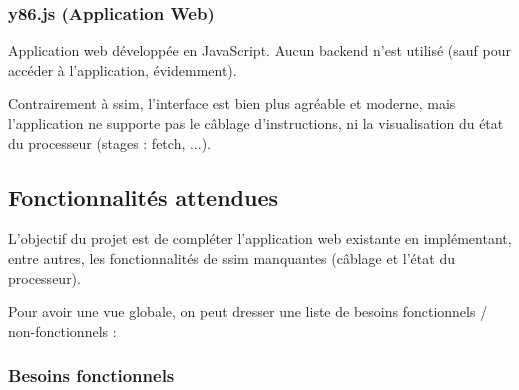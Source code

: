 \documentclass[french]{article}
\begin{document}
\subsubsection{y86.js (Application Web)}

Application web développée en JavaScript. Aucun backend n'est utilisé (sauf pour accéder à l'application, évidemment).

Contrairement à ssim, l'interface est bien plus agréable et moderne, mais l'application ne supporte pas le câblage d'instructions, ni la visualisation du état du processeur (stages : fetch, ...).

\subsection{Fonctionnalités attendues}

L'objectif du projet est de compléter l'application web existante en implémentant, entre autres, les fonctionnalités de ssim manquantes (câblage et l'état du processeur).

Pour avoir une vue globale, on peut dresser une liste de besoins fonctionnels / non-fonctionnels :\\

\subsubsection{Besoins fonctionnels}
\end{document}

